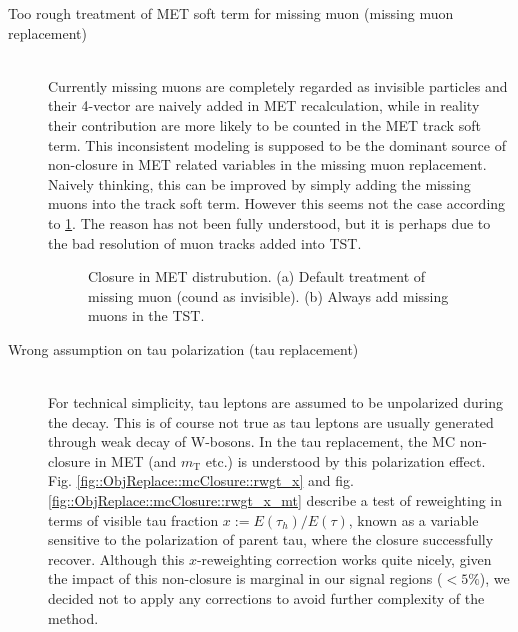 \begin{description}
\item [Too rough treatment of MET soft term for missing muon (missing muon replacement)]  \mbox{} \\
Currently missing muons are completely regarded as invisible particles and their 4-vector are naively added in MET recalculation, while in reality their contribution are more likely to be counted in the MET track soft term. This inconsistent modeling is supposed to be the dominant source of non-closure in MET related variables in the missing muon replacement. Naively thinking, this can be improved by simply adding the missing muons into the track soft term. However this seems not the case according to \ref{fig::ObjReplace::mcClosure::metSoftTerm_mu}. The reason has not been fully understood, but it is perhaps due to the bad resolution of muon tracks added into TST.

\begin{figure}[h]
  \centering
    \caption{Closure in MET distrubution. (a) Default treatment of missing muon (cound as invisible). (b) Always add missing muons in the TST.  \label{fig::ObjReplace::mcClosure::metSoftTerm_mu} }
\end{figure}


\item [Wrong assumption on tau polarization (tau replacement)] \mbox{} \\
For technical simplicity, tau leptons are assumed to be unpolarized during the decay. This is of course not true as tau leptons are usually generated through weak decay of W-bosons. In the tau replacement, the MC non-closure in MET (and $m_{\mathrm{T}}$ etc.) is understood by this polarization effect. Fig. \ref{fig::ObjReplace::mcClosure::rwgt_x} and fig. \ref{fig::ObjReplace::mcClosure::rwgt_x_mt} describe a test of reweighting in terms of visible tau fraction $x := E(\tau_{h})/E(\tau)$, known as a variable sensitive to the polarization of parent tau, where the closure successfully recover. Although this $x$-reweighting correction works quite nicely, given the impact of this non-closure is marginal in our signal regions ($<5\%$), we decided not to apply any corrections to avoid further complexity of the method.


\end{description}
